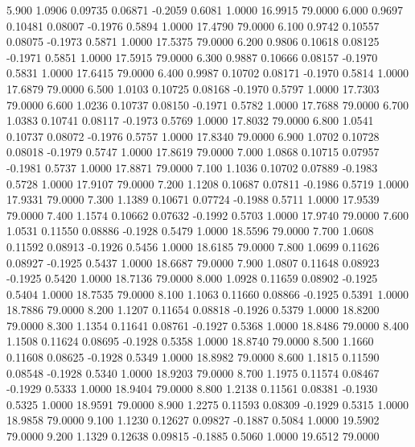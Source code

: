    5.900   1.0906   0.09735   0.06871  -0.2059   0.6081   1.0000  16.9915  79.0000
   6.000   0.9697   0.10481   0.08007  -0.1976   0.5894   1.0000  17.4790  79.0000
   6.100   0.9742   0.10557   0.08075  -0.1973   0.5871   1.0000  17.5375  79.0000
   6.200   0.9806   0.10618   0.08125  -0.1971   0.5851   1.0000  17.5915  79.0000
   6.300   0.9887   0.10666   0.08157  -0.1970   0.5831   1.0000  17.6415  79.0000
   6.400   0.9987   0.10702   0.08171  -0.1970   0.5814   1.0000  17.6879  79.0000
   6.500   1.0103   0.10725   0.08168  -0.1970   0.5797   1.0000  17.7303  79.0000
   6.600   1.0236   0.10737   0.08150  -0.1971   0.5782   1.0000  17.7688  79.0000
   6.700   1.0383   0.10741   0.08117  -0.1973   0.5769   1.0000  17.8032  79.0000
   6.800   1.0541   0.10737   0.08072  -0.1976   0.5757   1.0000  17.8340  79.0000
   6.900   1.0702   0.10728   0.08018  -0.1979   0.5747   1.0000  17.8619  79.0000
   7.000   1.0868   0.10715   0.07957  -0.1981   0.5737   1.0000  17.8871  79.0000
   7.100   1.1036   0.10702   0.07889  -0.1983   0.5728   1.0000  17.9107  79.0000
   7.200   1.1208   0.10687   0.07811  -0.1986   0.5719   1.0000  17.9331  79.0000
   7.300   1.1389   0.10671   0.07724  -0.1988   0.5711   1.0000  17.9539  79.0000
   7.400   1.1574   0.10662   0.07632  -0.1992   0.5703   1.0000  17.9740  79.0000
   7.600   1.0531   0.11550   0.08886  -0.1928   0.5479   1.0000  18.5596  79.0000
   7.700   1.0608   0.11592   0.08913  -0.1926   0.5456   1.0000  18.6185  79.0000
   7.800   1.0699   0.11626   0.08927  -0.1925   0.5437   1.0000  18.6687  79.0000
   7.900   1.0807   0.11648   0.08923  -0.1925   0.5420   1.0000  18.7136  79.0000
   8.000   1.0928   0.11659   0.08902  -0.1925   0.5404   1.0000  18.7535  79.0000
   8.100   1.1063   0.11660   0.08866  -0.1925   0.5391   1.0000  18.7886  79.0000
   8.200   1.1207   0.11654   0.08818  -0.1926   0.5379   1.0000  18.8200  79.0000
   8.300   1.1354   0.11641   0.08761  -0.1927   0.5368   1.0000  18.8486  79.0000
   8.400   1.1508   0.11624   0.08695  -0.1928   0.5358   1.0000  18.8740  79.0000
   8.500   1.1660   0.11608   0.08625  -0.1928   0.5349   1.0000  18.8982  79.0000
   8.600   1.1815   0.11590   0.08548  -0.1928   0.5340   1.0000  18.9203  79.0000
   8.700   1.1975   0.11574   0.08467  -0.1929   0.5333   1.0000  18.9404  79.0000
   8.800   1.2138   0.11561   0.08381  -0.1930   0.5325   1.0000  18.9591  79.0000
   8.900   1.2275   0.11593   0.08309  -0.1929   0.5315   1.0000  18.9858  79.0000
   9.100   1.1230   0.12627   0.09827  -0.1887   0.5084   1.0000  19.5902  79.0000
   9.200   1.1329   0.12638   0.09815  -0.1885   0.5060   1.0000  19.6512  79.0000
